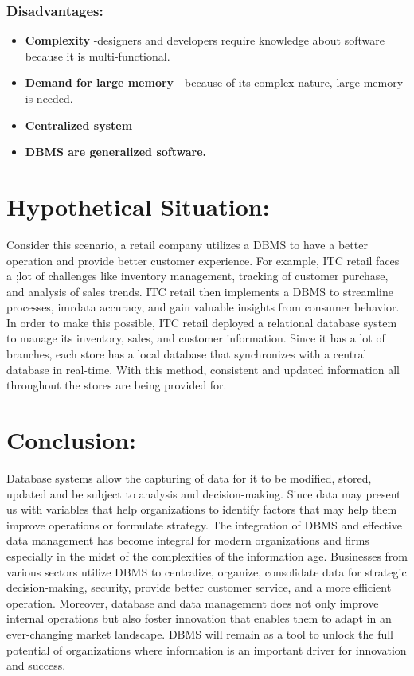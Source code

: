 \documentclass[
  letterpaper,
  DIV=11,
  numbers=noendperiod]{scrreprt}
\providecommand{\tightlist}{%
  \setlength{\itemsep}{0pt}\setlength{\parskip}{0pt}}\usepackage{longtable,booktabs,array}
\begin{document}
\subsubsection{Disadvantages:}\label{disadvantages}

\begin{itemize}
\tightlist
\item
  \textbf{Complexity} -designers and developers require knowledge about
  software because it is multi-functional.
\item
  \textbf{Demand for large memory} - because of its complex nature,
  large memory is needed.
\item
  \textbf{Centralized system}
\item
  \textbf{DBMS are generalized software.}
\end{itemize}

\section{Hypothetical Situation:}\label{hypothetical-situation}

Consider this scenario, a retail company utilizes a DBMS to have a
better operation and provide better customer experience. For example,
ITC retail faces a ;lot of challenges like inventory management,
tracking of customer purchase, and analysis of sales trends. ITC retail
then implements a DBMS to streamline processes, imr\prove data accuracy,
and gain valuable insights from consumer behavior. In order to make this
possible, ITC retail deployed a relational database system to manage its
inventory, sales, and customer information. Since it has a lot of
branches, each store has a local database that synchronizes with a
central database in real-time. With this method, consistent and updated
information all throughout the stores are being provided for.

\section{Conclusion:}\label{conclusion-1}

Database systems allow the capturing of data for it to be modified,
stored, updated and be subject to analysis and decision-making. Since
data may present us with variables that help organizations to identify
factors that may help them improve operations or formulate strategy. The
integration of DBMS and effective data management has become integral
for modern organizations and firms especially in the midst of the
complexities of the information age. Businesses from various sectors
utilize DBMS to centralize, organize, consolidate data for strategic
decision-making, security, provide better customer service, and a more
efficient operation. Moreover, database and data management does not
only improve internal operations but also foster innovation that enables
them to adapt in an ever-changing market landscape. DBMS will remain as
a tool to unlock the full potential of organizations where information
is an important driver for innovation and success.
\end{document}
